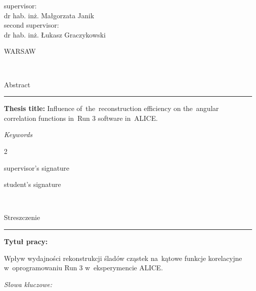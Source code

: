 \documentclass[11pt,a4paper,twoside]{book}
\numberwithin{equation}{chapter}
\newcommand{\thesistitle}{Influence of the reconstruction efficiency on the angular correlation functions in Run 3 software in ALICE.}
\newcommand{\thesistitlepl}{\begin{otherlanguage}{polish}
    Wpływ wydajności rekonstrukcji śladów cząstek na kątowe funkcje korelacyjne w oprogramowaniu Run 3 w eksperymencie ALICE.
\end{otherlanguage}}
\begin{document}
\begin{titlepage}
    \vspace{1.5cm}

    \begin{minipage}{\textwidth}
        \begin{center}
            {\large supervisor: \\
                dr hab. inż. Małgorzata Janik}\\
            \vspace{0.5cm}
            {\large second supervisor: \\
                dr hab. inż. Łukasz Graczykowski}
        \end{center}
    \end{minipage}%

    \vfill

    \begin{minipage}[b]{\textwidth}
        \begin{center}
            {\large WARSAW \the\year{}}
        \end{center}
    \end{minipage}
\end{titlepage}

\newpage
\mbox{ }

\newpage
{\Large Abstract}

{\color{plum}\rule[1pt]{\textwidth}{2pt}}

\textbf{Thesis title:} \thesistitle


\vspace{0.025\textheight}
\textit{Keywords}\\
\textit{}

\vfill

\begin{multicols}{2}
    \begin{flushleft}
        supervisor's signature
    \end{flushleft}
    \begin{flushright}
        student's signature
    \end{flushright}
\end{multicols}

\newpage
\mbox{ }

\newpage
{\Large Streszczenie}

{\color{plum}\rule[1pt]{\textwidth}{2pt}}

\textbf{Tytuł pracy:} \thesistitlepl

\vspace{0.025\textheight}
\textit{Słowa kluczowe:}\\
\textit{}
\end{document}
